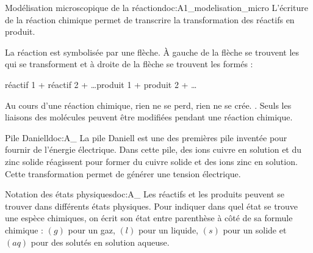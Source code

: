 \begin{doc}{Modélisation microscopique de la réaction}{doc:A1_modelisation_micro}
  L'écriture de la réaction chimique permet de transcrire la transformation des réactifs en produit.
  
  \begin{importants}
    La réaction est symbolisée par une flèche. À gauche de la flèche se trouvent les  qui se transforment et à droite de la flèche se trouvent les  formés :
    \begin{center}
      réactif 1 + réactif 2 + \ldots \reaction produit 1 + produit 2 + \ldots
    \end{center}
  \end{importants}
  
  Au cours d'une réaction chimique, rien ne se perd, rien ne se crée. .
  Seuls les liaisons des molécules peuvent être modifiées pendant une réaction chimique.
\end{doc}

\begin{doc}{Pile Daniell}{doc:A_}
  La pile Daniell est une des premières pile inventée pour fournir de l'énergie électrique.
  Dans cette pile, des ions cuivre  en solution et du zinc solide  réagissent pour former du cuivre solide  et des ions zinc  en solution.
  Cette transformation permet de générer une tension électrique.
\end{doc}

\vspace*{-30pt}



\begin{doc}{Notation des états physiques}{doc:A_}
  Les réactifs et les produits peuvent se trouver dans différents états physiques.
  Pour indiquer dans quel état se trouve une espèce chimiques, on écrit son état entre parenthèse à côté de sa formule chimique : $(g)$ pour un gaz, $(l)$ pour un liquide, $(s)$ pour un solide et $(aq)$ pour des solutés en solution aqueuse.
\end{doc}

